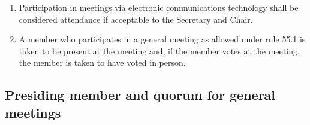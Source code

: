 \documentclass[../constitution.tex]{subfiles}
\begin{document}
\begin{enumerate}

\item Participation in meetings via electronic communications technology shall be considered attendance if acceptable to the Secretary and Chair.
\item A member who participates in a general meeting as allowed under rule 55.1 is taken to be present at the meeting and, if the member votes at the meeting, the member is taken to have voted in person.
\end{enumerate}

\hypertarget{presiding-member-and-quorum-for-general-meetings}{%
\subsection{Presiding member and quorum for general meetings}\label{presiding-member-and-quorum-for-general-meetings}}
\end{document}
